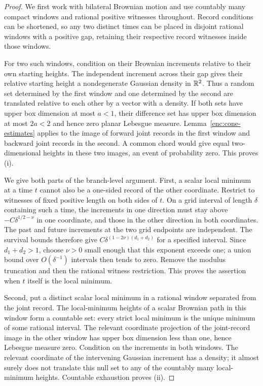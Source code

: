\begin{proof}
We first work with bilateral Brownian motion and use countably many
compact windows and rational positive witnesses throughout.  Record
conditions can be shortened, so any two distinct times can be placed
in disjoint rational windows with a positive gap, retaining their
respective record witnesses inside those windows.

For two such windows, condition on their Brownian increments relative
to their own starting heights.  The independent increment across their
gap gives their relative starting height a nondegenerate Gaussian
density in $\mathbb R^2$.  Thus a random set determined by the first window and
one determined by the second are translated relative to each other by
a vector with a density.  If both sets have upper box dimension at most
$a<1$, their difference set has upper box dimension at most $2a<2$ and
hence zero planar Lebesgue measure.  Lemma~\ref{enc:cone-estimates}
applies to the image of forward joint records in the first window and
backward joint records in the second.  A common chord would give equal
two-dimensional heights in these two images, an event of probability
zero.  This proves (i).

We give both parts of the branch-level argument.  First, a scalar local
minimum at a time $t$ cannot also be a one-sided record of the other
coordinate.  Restrict to witnesses of fixed positive length on both
sides of $t$.  On a grid interval of length $\delta$ containing such
a time, the increments in one direction must stay above
$-C\delta^{1/2-\nu}$ in one coordinate, and those in the other direction
in both coordinates.  The past and future increments at the two grid
endpoints are independent.  The survival bounds therefore give
$C\delta^{(1-2\nu)(d_1+d_2)}$ for a specified interval.  Since
$d_1+d_2>1$, choose $\nu>0$ small enough that this exponent exceeds
one; a union bound over $O(\delta^{-1})$ intervals then tends to
zero.  Remove the modulus truncation and then the rational witness
restriction.  This proves the assertion when $t$ itself is the local
minimum.

Second, put a distinct scalar local minimum in a rational window
separated from the joint record.  The local-minimum heights of a scalar
Brownian path in this window form a countable set: every strict local
minimum is the unique minimum of some rational interval.  The relevant
coordinate projection of the joint-record image in the other window
has upper box dimension less than one, hence Lebesgue measure zero.
Condition on the increments in both windows.  The relevant coordinate
of the intervening Gaussian increment has a density; it almost surely
does not translate this null set to any of the countably many
local-minimum heights.  Countable exhaustion proves (ii).


\end{proof}
